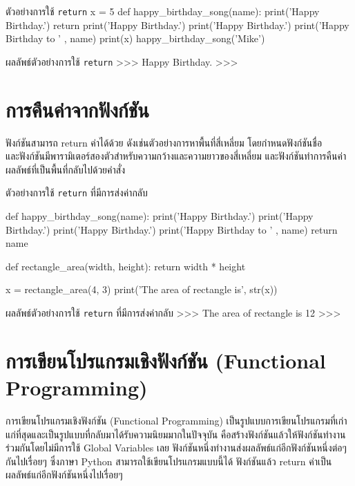 \begin{codelist}{ตัวอย่างการใช้ \texttt{return}}{}
x = 5
def happy_birthday_song(name):
    print('Happy Birthday.')
    return
    print('Happy Birthday.')
    print('Happy Birthday.')
    print('Happy Birthday to ' , name)
    print(x)
happy_birthday_song('Mike')
\end{codelist}

\begin{codelist}{ผลลัพธ์ตัวอย่างการใช้ \texttt{return}}{}
>>>
Happy Birthday.
>>>
\end{codelist}

\section{การคืนค่าจากฟังก์ชัน}

ฟังก์ชันสามารถ return ค่าได้ด้วย ดังเช่นตัวอย่างการหาพื้นที่สี่เหลี่ยม โดยกำหนดฟังก์ชันชื่อ \\   และฟังก์ชันมีพารามิเตอร์สองตัวสำหรับความกว้างและความยาวของสี่เหลี่ยม และฟังก์ชันทำการคืนค่า ผลลัพธ์ที่เป็นพื้นที่กลับไปด้วยคำสั่ง 


\begin{codelist}{ตัวอย่างการใช้ \texttt{return} ที่มีการส่งค่ากลับ}{}

def happy_birthday_song(name):
    print('Happy Birthday.')
    print('Happy Birthday.')
    print('Happy Birthday.')
    print('Happy Birthday to ' , name)
    return name

def rectangle_area(width, height):
    return width * height
    
x = rectangle_area(4, 3)
print('The area of rectangle is', str(x))
\end{codelist}


\begin{codelist}{ผลลัพธ์ตัวอย่างการใช้ \texttt{return} ที่มีการส่งค่ากลับ}{}
>>>
The area of rectangle is 12
>>>
\end{codelist}


\section{การเขียนโปรแกรมเชิงฟังก์ชัน (Functional Programming)}


การเขียนโปรแกรมเชิงฟังก์ชัน (Functional Programming) เป็นรูปแบบการเขียนโปรแกรมที่เก่าแก่ที่สุดและเป็นรูปแบบที่กลับมาได้รับความนิยมมากในปัจจุบัน คือสร้างฟังก์ชันแล้วให้ฟังก์ชันทำงานร่วมกันโดยไม่มีการใช้ Global Variables เลย ฟังก์ชันหนึ่งทำงานส่งผลลัพธ์แก่อีกฟังก์ชันหนึ่งต่อๆ กันไปเรื่อยๆ ซึ่งภาษา Python สามารถใช้เขียนโปรแกรมแบบนี้ได้ ฟังก์ชันแล้ว return ค่าเป็นผลลัพธ์แก่อีกฟังก์ชันหนึ่งไปเรื่อยๆ  

